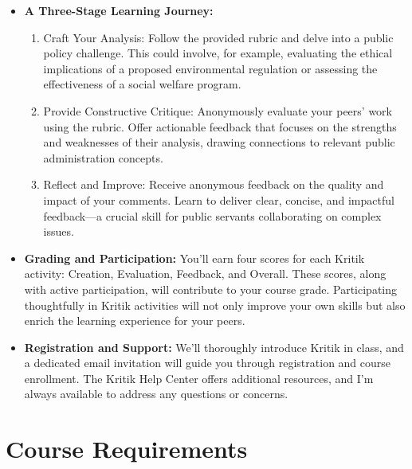 \documentclass[10pt, letterpaper]{article}
\begin{document}
\begin{itemize}

\item \textbf{A Three-Stage Learning Journey:}

    \begin{enumerate}
        \item Craft Your Analysis: Follow the provided rubric and delve into a public policy challenge. This could involve, for example, evaluating the ethical implications of a proposed environmental regulation or assessing the effectiveness of a social welfare program.
        \item Provide Constructive Critique: Anonymously evaluate your peers' work using the rubric. Offer actionable feedback that focuses on the strengths and weaknesses of their analysis, drawing connections to relevant public administration concepts.
        \item Reflect and Improve: Receive anonymous feedback on the quality and impact of your comments. Learn to deliver clear, concise, and impactful feedback—a crucial skill for public servants collaborating on complex issues.
    \end{enumerate}

\item \textbf{Grading and Participation:} You'll earn four scores for each Kritik activity: Creation, Evaluation, Feedback, and Overall. These scores, along with active participation, will contribute to your course grade. Participating thoughtfully in Kritik activities will not only improve your own skills but also enrich the learning experience for your peers.

\item \textbf{Registration and Support:} We'll thoroughly introduce Kritik in class, and a dedicated email invitation will guide you through registration and course enrollment. The Kritik Help Center offers additional resources, and I'm always available to address any questions or concerns.

\end{itemize}

\section*{Course Requirements}
\end{document}

